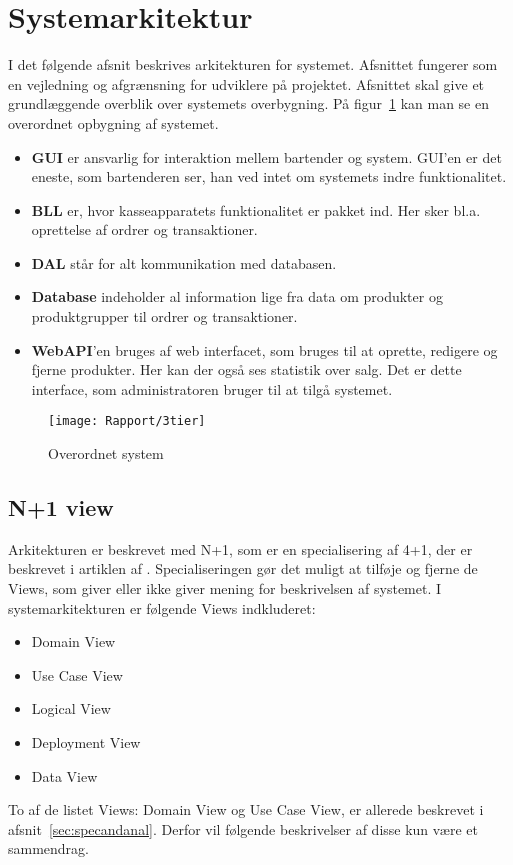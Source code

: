 \newpage
\section{Systemarkitektur}
I det følgende afsnit beskrives arkitekturen for systemet. Afsnittet fungerer som en vejledning og afgrænsning for udviklere på projektet. Afsnittet skal give et grundlæggende overblik over systemets overbygning. På figur~\ref{fig:ArkiDia} kan man se en overordnet opbygning af systemet.
	
\begin{itemize}
	\item \textbf{\gls{GUI}} er ansvarlig for interaktion mellem \Gls{bartender} og \Gls{system}. \gls{GUI}'en er det eneste, som \Gls{bartender}en ser, han ved intet om \gls{system}ets indre funktionalitet.
	\item \textbf{\gls{BLL}} er, hvor kasseapparatets funktionalitet er pakket ind. Her sker bl.a. oprettelse af ordrer og transaktioner.
	\item \textbf{\gls{DAL}} står for alt kommunikation med databasen.
	\item \textbf{Database} indeholder al information lige fra data om produkter og produktgrupper til ordrer og transaktioner.
	\item \textbf{\gls{WebAPI}}'en bruges af web interfacet, som bruges til at oprette, redigere og fjerne produkter. Her kan der også ses statistik over salg. Det er dette interface, som \Gls{administrator}en bruger til at tilgå \gls{system}et.
\end{itemize}

\begin{figure}[H]
	\centering
	\texttt{[image: Rapport/3tier]}
	\caption{Overordnet system}
	\label{fig:ArkiDia}
\end{figure}

\subsection{N+1 view}
Arkitekturen er beskrevet med N+1, som er en specialisering af 4+1, der er beskrevet i artiklen af \cite{4plus1}. Specialiseringen gør det muligt at tilføje og fjerne de Views, som giver eller ikke giver mening for beskrivelsen af \gls{system}et. I systemarkitekturen er følgende Views indkluderet:
\begin{itemize}
	\item Domain View
	\item Use Case View
	\item Logical View
	\item Deployment View
	\item Data View
\end{itemize}
To af de listet Views: Domain View og Use Case View, er allerede beskrevet i afsnit~\ref{sec:specandanal}. Derfor vil følgende beskrivelser af disse kun være et sammendrag.

